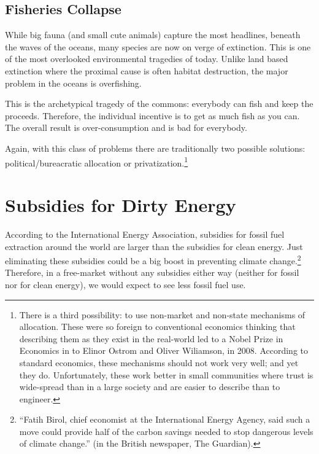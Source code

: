 
\subsection{Fisheries Collapse}

While big fauna (and small cute animals) capture the most headlines, beneath
the waves of the oceans, many species are now on verge of extinction. This is
one of the most overlooked environmental tragedies of today. Unlike land based
extinction where the proximal cause is often habitat destruction, the major
problem in the oceans is overfishing.

This is the archetypical tragedy of the commons: everybody can fish and keep
the proceeds. Therefore, the individual incentive is to get as much fish as you
can. The overall result is over-consumption and is bad for everybody.

Again, with this class of problems there are traditionally two possible
solutions: political/bureacratic allocation or privatization.\footnote{There
is a third possibility: to use non-market and non-state mechanisms of
allocation. These were so foreign to conventional economics thinking that
describing them as they exist in the real-world led to a Nobel Prize in
Economics in to Elinor Ostrom and Oliver Wiliamson, in 2008. According to
standard economics, these mechanisms should not work very well; and yet they
do. Unfortunately, these work better in small communities where trust is
wide-spread than in a large society and are easier to describe than to
engineer.}

\section{Subsidies for Dirty Energy}

According to the International Energy Association, subsidies for fossil fuel
extraction around the world are larger than the subsidies for clean energy.
Just eliminating these subsidies could be a big boost in preventing climate
change.\footnote{``Fatih Birol, chief
economist at the International Energy Agency, said such a move could
provide half of the carbon savings needed to stop dangerous levels of climate
change.'' (in the British newspaper, The Guardian).%
} Therefore, in a free-market without any subsidies either way (neither for
fossil nor for clean energy), we would expect to see less fossil fuel use.

